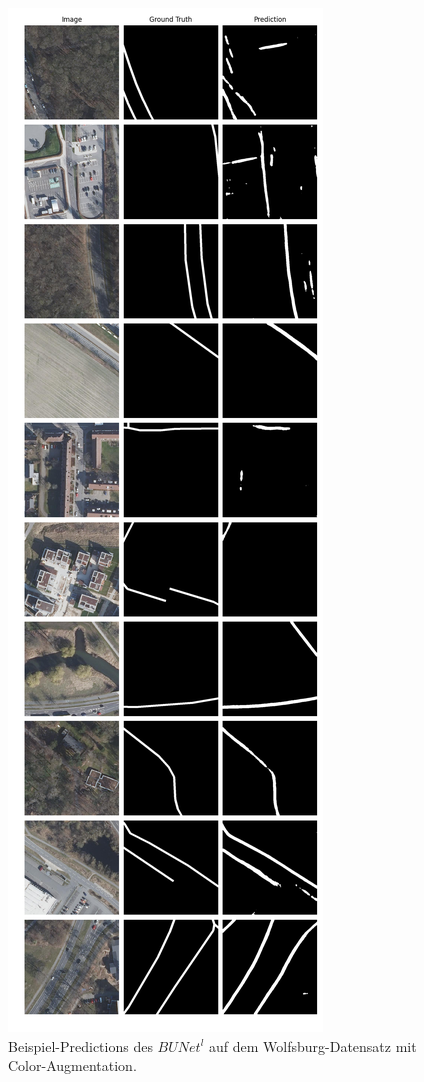 \begin{figure}
	\centering
	\includegraphics[width=.41\textwidth]{Bilder/wolfsburg-color-samples/bunet2-l.png}
	\caption{Beispiel-Predictions des $BUNet^l$ auf dem Wolfsburg-Datensatz mit Color-Augmentation.}
	\label{fig:wolfsburg-color-samples-bunet2-l}
\end{figure}

